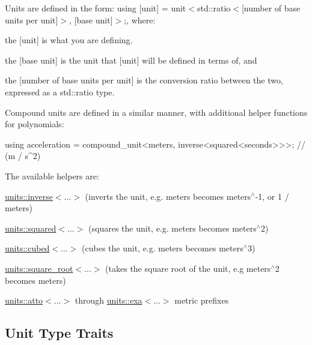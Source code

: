 Units are defined in the form\+: {\ttfamily using \mbox{[}unit\mbox{]} = unit$<$std\+::ratio$<$\mbox{[}number of base units per unit\mbox{]}$>$, \mbox{[}base unit\mbox{]}$>$;}, where\+:
\begin{DoxyItemize}
\item the {\ttfamily \mbox{[}unit\mbox{]}} is what you are defining.
\item the {\ttfamily \mbox{[}base unit\mbox{]}} is the unit that {\ttfamily \mbox{[}unit\mbox{]}} will be defined in terms of, and
\item the {\ttfamily \mbox{[}number of base units per unit\mbox{]}} is the conversion ratio between the two, expressed as a {\ttfamily std\+::ratio} type.
\end{DoxyItemize}

Compound units are defined in a similar manner, with additional helper functions for polynomials\+: \begin{DoxyVerb}using acceleration = compound_unit<meters, inverse<squared<seconds>>>;      // (m / s^2)
\end{DoxyVerb}


The available helpers are\+:
\begin{DoxyItemize}
\item {\ttfamily \hyperlink{group___unit_manipulators_gaacc539ef162e24b260d023d3ff949b57}{units\+::inverse}$<$...$>$} (inverts the unit, e.\+g. meters becomes meters$^\wedge$-\/1, or 1 / meters)
\item {\ttfamily \hyperlink{group___unit_manipulators_ga636346f7898c35eb98a796bec1d77fb2}{units\+::squared}$<$...$>$} (squares the unit, e.\+g. meters becomes meters$^\wedge$2)
\item {\ttfamily \hyperlink{group___unit_manipulators_gad3e94dc693fe45a580b382cb666434a1}{units\+::cubed}$<$...$>$} (cubes the unit, e.\+g. meters becomes meters$^\wedge$3)
\item {\ttfamily \hyperlink{group___unit_manipulators_ga66c5d3d0e80c7c3e56683d7df366b380}{units\+::square\+\_\+root}$<$...$>$} (takes the square root of the unit, e.\+g meters$^\wedge$2 becomes meters)
\item {\ttfamily \hyperlink{group___unit_manipulators_ga8a7180c782263384a118dc8ffa5bc689}{units\+::atto}$<$...$>$} through {\ttfamily \hyperlink{group___unit_manipulators_gad0c18c5a47e0fe677715f0328f818515}{units\+::exa}$<$...$>$} metric prefixes
\end{DoxyItemize}

\subsection*{Unit Type Traits }

